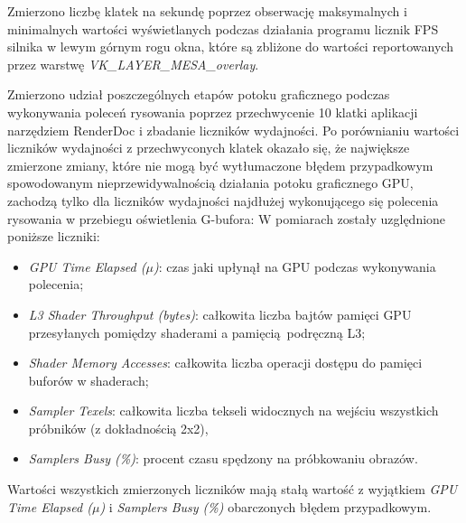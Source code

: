 Zmierzono liczbę klatek na sekundę poprzez obserwację maksymalnych i minimalnych wartości wyświetlanych podczas działania programu licznik FPS silnika w lewym górnym rogu okna, które są zbliżone do wartości reportowanych przez warstwę \textit{VK\_LAYER\_MESA\_overlay}.

Zmierzono udział poszczególnych etapów potoku graficznego podczas wykonywania poleceń rysowania poprzez przechwycenie 10 klatki aplikacji narzędziem RenderDoc i zbadanie liczników wydajności.
Po porównianiu wartości liczników wydajności z przechwyconych klatek okazało się, że największe zmierzone zmiany, które nie mogą być wytłumaczone błędem przypadkowym spowodowanym nieprzewidywalnością działania potoku graficznego GPU, zachodzą tylko dla liczników wydajności najdłużej wykonującego się polecenia rysowania w przebiegu oświetlenia G-bufora:
W pomiarach zostały uzględnione poniższe liczniki:
\begin{itemize}
	\item \textit{GPU Time Elapsed ($\mu$)}: czas jaki upłynął na GPU podczas wykonywania polecenia;
	\item \textit{L3 Shader Throughput (bytes)}: całkowita liczba bajtów pamięci GPU przesyłanych pomiędzy shaderami a pamięcią podręczną L3;
	\item \textit{Shader Memory Accesses}: całkowita liczba operacji dostępu do pamięci buforów w shaderach;
	\item \textit{Sampler Texels}: całkowita liczba tekseli widocznych na wejściu wszystkich próbników (z dokładnością 2x2),
	\item \textit{Samplers Busy (\%)}: procent czasu spędzony na próbkowaniu obrazów.
\end{itemize}
Wartości wszystkich zmierzonych liczników mają stałą wartość z wyjątkiem \textit{GPU Time Elapsed ($\mu$)} i \textit{Samplers Busy (\%)} obarczonych błędem przypadkowym.

